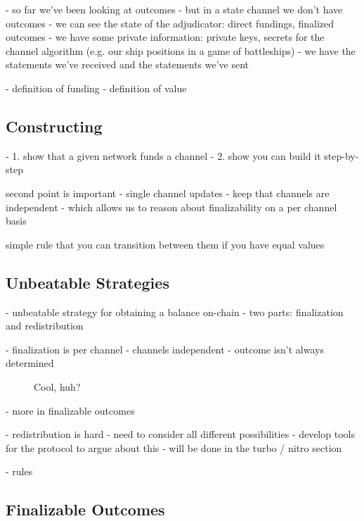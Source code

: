 - so far we've been looking at outcomes
- but in a state channel we don't have outcomes
- we can see the state of the adjudicator: direct fundings, finalized outcomes
- we have some private information: private keys, secrets for the channel algorithm (e.g. our ship positions in a game of battleships)
- we have the statements we've received and the statements we've sent

\begin{figure}[h]\centering
  \makebox[\textwidth][c]{}
  \caption{
  }\label{fig:system-state-direct-funding}
\end{figure}

- definition of funding
- definition of value


\subsection{Constructing}

- 1. show that a given network funds a channel
- 2. show you can build it step-by-step

second point is important
- single channel updates
- keep that channels are independent - which allows us to reason about finalizability on a per channel basis

simple rule that you can transition between them if you have equal values

\subsection{Unbeatable Strategies}

- unbeatable strategy for obtaining a balance on-chain
- two parts: finalization and redistribution

- finalization is per channel - channels independent
- outcome isn't always determined
\begin{figure}[h]\centering
  \makebox[\textwidth][c]{}
  \caption{Cool, huh?}
\end{figure}


- more in finalizable outcomes

- redistribution is hard
- need to consider all different possibilities
- develop tools for the protocol to argue about this
- will be done in the turbo / nitro section

- rules

\subsection{Finalizable Outcomes}

